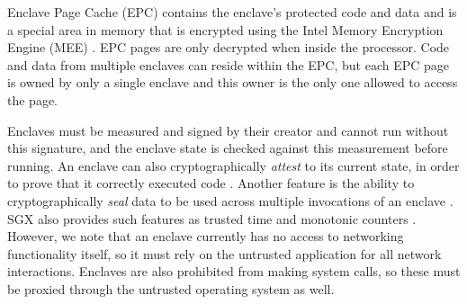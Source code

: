 Enclave Page Cache (EPC) contains the enclave's protected code and data and is
a special area in memory that is encrypted using the Intel Memory Encryption
Engine (MEE) \cite{sgx3}.  EPC pages are only decrypted when inside the
processor.  Code and data from multiple enclaves can reside within the EPC, but
each EPC page is owned by only a single enclave and this owner is the only one
allowed to access the page.

Enclaves must be measured and signed by their creator and cannot run without
this signature, and the enclave state is checked against this measurement
before running.  An enclave can also cryptographically \textit{attest} to its
current state, in order to prove that it correctly executed code
\cite{sgx_provisioning, anati2013innovative}.  Another feature is the ability
to cryptographically \textit{seal} data to be used across multiple invocations
of an enclave \cite{anati2013innovative, sgx_sealing}.  SGX also provides such
features as trusted time and monotonic counters
\cite{sgx_sdk_guide,sgx_trusted_time}.  However, we note that an enclave
currently has no access to networking functionality itself, so it must rely on
the untrusted application for all network interactions.  Enclaves are also
prohibited from making system calls, so these must be proxied through the
untrusted operating system as well.





